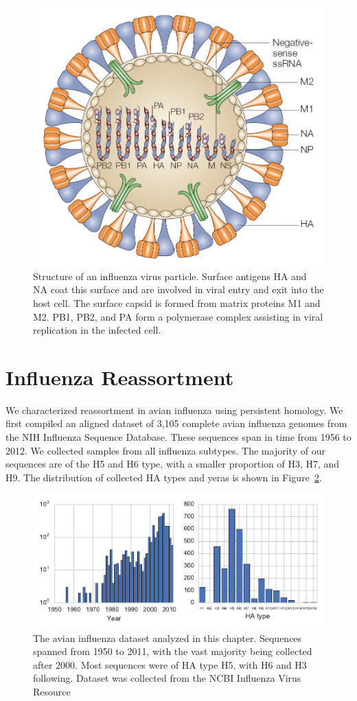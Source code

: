 \begin{figure}
\begin{center}
\centerline{\includegraphics[width=.5\columnwidth]{./fig/influenza/flu_genome.jpg}}
\caption[Structure of an influenza virus particle]{Structure of an influenza virus particle. Surface antigens HA and NA coat this surface and are involved in viral entry and exit into the host cell. The surface capsid is formed from matrix proteins M1 and M2. PB1, PB2, and PA form a polymerase complex assisting in viral replication in the infected cell.}
\label{fig:flu:genome}
\end{center}
\end{figure}

\section{Influenza Reassortment}
\label{flu:reassortment}

We characterized reassortment in avian influenza using persistent homology.
We first compiled an aligned dataset of 3,105 complete avian influenza genomes from the NIH Influenza Sequence Database.
These sequences span in time from 1956 to 2012. 
We collected samples from all influenza subtypes.
The majority of our sequences are of the H5 and H6 type, with a smaller proportion of H3, H7, and H9.
The distribution of collected HA types and yeras is shown in Figure~\ref{fig:flu:histograms}.

\begin{figure}
\centering
\includegraphics[]{fig/influenza/flu_histograms.pdf}
\caption[Influenza Dataset Statistics]{The avian influenza dataset analyzed in this chapter. Sequences spanned from 1950 to 2011, with the vast majority being collected after 2000. Most sequences were of HA type H5, with H6 and H3 following. Dataset was collected from the NCBI Influenza Virus Resource \cite{Bao:2008cq}}
\label{fig:flu:histograms}
\end{figure}


